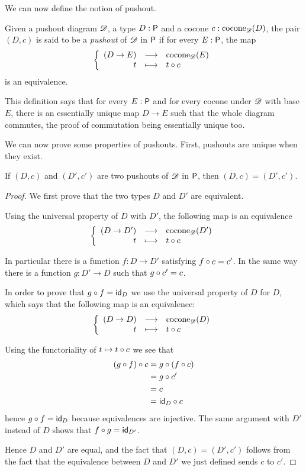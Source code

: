 We can now define the notion of pushout.

\begin{defn}
  Given a pushout diagram $\Ddiag$, a type $D:\P$ and a cocone
  $c:\cocone{\Ddiag}{D}$, the pair $(D,c)$ is said to be a \emph{pushout}
  of $\Ddiag$ in $\P$ if for every $E:\P$, the map
  \[\function{(D\to{}E)}{\cocone{\Ddiag}{E}}{t}{\composecocone{t}c}\]
  is an equivalence.
\end{defn}

This definition says that for every $E:\P$ and for every cocone under $\Ddiag$
with base $E$, there is an essentially unique map $D\to{}E$ such that the whole
diagram commutes, the proof of commutation being essentially unique too.

We can now prove some properties of pushouts. First, pushouts are unique when
they exist.

\begin{lem}
  If $(D,c)$ and $(D',c')$ are two pushouts of $\Ddiag$ in $\P$, then
  $(D,c)=(D',c')$.
\end{lem}
\begin{proof}
  We first prove that the two types $D$ and $D'$ are equivalent.

  Using the universal property of $D$ with $D'$, the following map is an
  equivalence
  \[\function{(D\to{}D')}{\cocone{\Ddiag}{D'}}{t}{\composecocone{t}c}\]

  In particular there is a function $f:D\to{}D'$ satisfying $\composecocone{f}c=c'$. In the
  same way there is a function $g:D'\to{}D$ such that $\composecocone{g}c'=c$.

  In order to prove that $g\circ{}f=\idfunc[D]$ we use the universal property of
  $D$ for $D$, which says that the following map is an equivalence:
  \[\function{(D\to{}D)}{\cocone{\Ddiag}{D}}{t}{\composecocone{t}c}\]

  Using the functoriality of $t\mapsto{}\composecocone{t}c$ we see that
  \begin{align*}
    \composecocone{(g\circ{}f)}c &= \composecocone{g}(\composecocone{f}c) \\
    &= \composecocone{g}c' \\
    &= c \\
    &= \composecocone{\idfunc[D]}c
  \end{align*}
  hence
  $g\circ{}f=\idfunc[D]$ because equivalences are injective. The same argument
  with $D'$ instead of $D$ shows that $f\circ{}g=\idfunc[D']$.

  Hence $D$ and $D'$ are equal, and the fact that $(D,c)=(D',c')$ follows from
  the fact that the equivalence between $D$ and $D'$ we just defined sends $c$
  to $c'$.
\end{proof}

